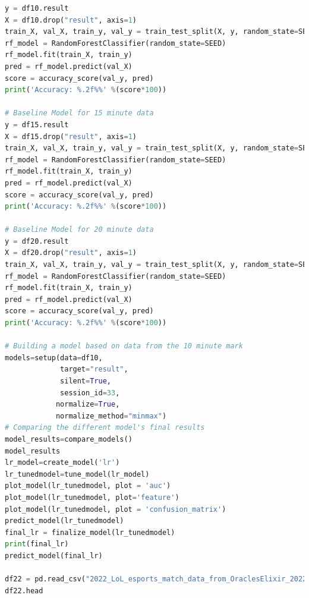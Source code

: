 \begin{lstlisting}[language=python,label={lst:pythoncode}]
y = df10.result
X = df10.drop("result", axis=1)
train_X, val_X, train_y, val_y = train_test_split(X, y, random_state=SEED)
rf_model = RandomForestClassifier(random_state=SEED)
rf_model.fit(train_X, train_y)
pred = rf_model.predict(val_X)
score = accuracy_score(val_y, pred)
print('Accuracy: %.2f%%' %(score*100))

# Baseline Model for 15 minute data
y = df15.result
X = df15.drop("result", axis=1)
train_X, val_X, train_y, val_y = train_test_split(X, y, random_state=SEED)
rf_model = RandomForestClassifier(random_state=SEED)
rf_model.fit(train_X, train_y)
pred = rf_model.predict(val_X)
score = accuracy_score(val_y, pred)
print('Accuracy: %.2f%%' %(score*100))

# Baseline Model for 20 minute data
y = df20.result
X = df20.drop("result", axis=1)
train_X, val_X, train_y, val_y = train_test_split(X, y, random_state=SEED)
rf_model = RandomForestClassifier(random_state=SEED)
rf_model.fit(train_X, train_y)
pred = rf_model.predict(val_X)
score = accuracy_score(val_y, pred)
print('Accuracy: %.2f%%' %(score*100))

# Building a model based on data from the 10 minute mark
models=setup(data=df10,
             target="result",
             silent=True,
             session_id=33,
            normalize=True,
            normalize_method="minmax")
# Comparing the different model's final results
model_results=compare_models()
model_results
lr_model=create_model('lr')
lr_tunedmodel=tune_model(lr_model)
plot_model(lr_tunedmodel, plot = 'auc')
plot_model(lr_tunedmodel, plot='feature')
plot_model(lr_tunedmodel, plot = 'confusion_matrix')
predict_model(lr_tunedmodel)
final_lr = finalize_model(lr_tunedmodel)
print(final_lr)
predict_model(final_lr)

df22 = pd.read_csv("2022_LoL_esports_match_data_from_OraclesElixir_20220606.csv")
df22.head


\end{lstlisting}
